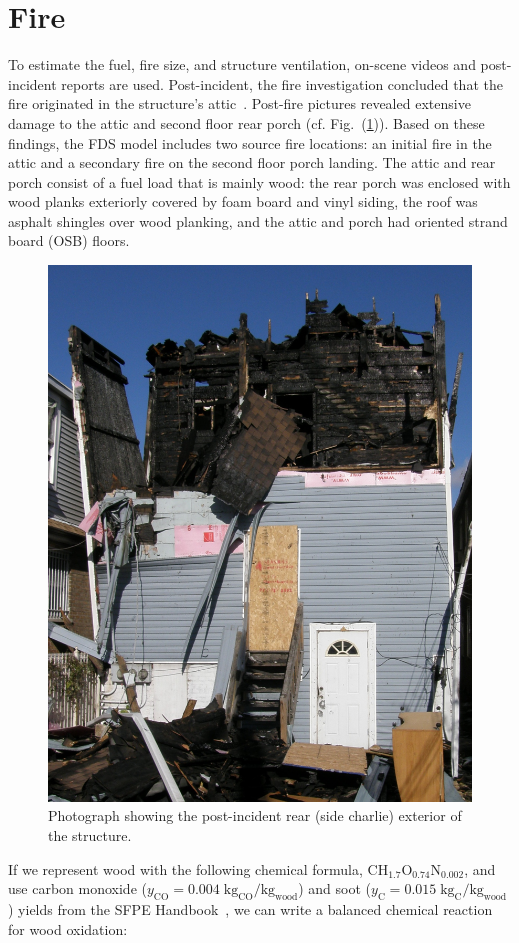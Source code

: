 \documentclass[11pt,oneside]{book}
\renewcommand{\C}{\mbox{C}}
\renewcommand{\H}{\mbox{H}}
\renewcommand{\O}{\mbox{O}}
\newcommand{\N}{\mbox{N}}
\begin{document}
\section{Fire}
\label{fire}

To estimate the fuel, fire size, and structure ventilation, on-scene videos and post-incident reports are used. Post-incident, the fire investigation concluded that the fire originated in the structure's attic~\cite{NIOSH:Bowyer}. Post-fire pictures revealed extensive damage to the attic and second floor rear porch (cf. Fig.~(\ref{fig:charlie_ex})). Based on these findings, the FDS model includes two source fire locations: an initial fire in the attic and a secondary fire on the second floor porch landing. The attic and rear porch consist of a fuel load that is mainly wood: the rear porch was enclosed with wood planks exteriorly covered by foam board and vinyl siding, the roof was asphalt shingles over wood planking, and the attic and porch had oriented strand board (OSB) floors.  

\begin{figure}[h!]
\centering
\includegraphics[width=.65\textwidth]{../Figures/exterior_charlie}
\caption{Photograph showing the post-incident rear (side charlie) exterior of the structure.}
\label{fig:charlie_ex}
\end{figure}

If we represent wood with the following chemical formula, $\C\H_{1.7}\O_{0.74}\N_{0.002}$, and use carbon monoxide ($y_{\mathrm{CO}}=0.004 \; {\mathrm{kg_{CO}}/\mathrm{kg_{wood}}}$) and soot ($y_{\mathrm{C}}=0.015 \; {\mathrm{kg_{C}}/\mathrm{kg_{wood}}}$) yields from the SFPE Handbook~\cite{SFPE:Tewarson}, we can write a balanced chemical reaction for wood oxidation:
\end{document}
